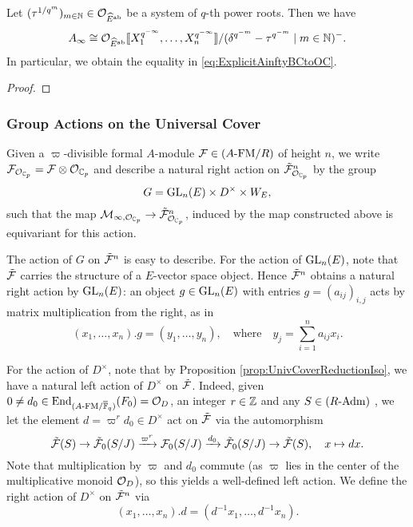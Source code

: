 \documentclass[../main.tex]{subfiles}
\begin{document}
\begin{cor}\label{cor:StructureOfAinfty}
  Let $(\tau^{1/q^m})_{m \in \mathbb{N}} \in \mathcal{O}_{\widehat E^{\mathrm{ab}}}$ be a  system of $q$-th power roots. Then we have 
  \begin{equation*}
  A_\infty \cong \mathcal{O}_{\widehat E^{\mathrm{ab}}}\llbracket X_1^{q^{-\infty}}, \dots,
  X_n^{q^{-\infty}}\rrbracket/(\delta^{q^{-m}} - \tau^{q^{-m}} \mid m \in \mathbb{N})^-.
  \end{equation*}
  In particular, we obtain the equality in \eqref{eq:ExplicitAinftyBCtoOC}.
\begin{proof}
\end{proof}
\end{cor}



\subsubsection{Group Actions on the Universal Cover} %
\label{ssub:Group Actions on the Universal Cover}
Given a $\varpi$-divisible formal $A$-module $\mathcal{F} \in {({A}\text-\allowbreak\mathrm{FM}/{R})}$ of height
$n$, we write $\mathcal{F}_{\mathcal{O}_{\mathbb{C}_p}} = \mathcal{F} \otimes \mathcal{O}_{\mathbb{C}_p}$ and describe a natural right
action on $\tilde {\mathcal{F}}_{\mathcal{O}_{\mathbb{C}_p}}^n$ by the group 
\begin{equation*}
  G = \operatorname{GL}_n(E) \times D^\times \times W_E,
\end{equation*}
such that the map $\mathcal{M}_{\infty, \mathcal{O}_{\mathbb{C}_p}} \to \tilde {\mathcal{F}}_{\mathcal{O}_{\mathbb{C}_p}}^n$,
induced by the map constructed above is equivariant for this action. 

The action of $G$ on $\tilde {\mathcal{F}}^n$ is easy to describe. For the action of
$\operatorname{GL}_n(E)$, note that $\tilde {\mathcal{F}}$ carries the structure of a $E$-vector space
object. Hence $\tilde {\mathcal{F}}^n$ obtains a natural right action by $\operatorname{GL}_n(E)$: an
object $g \in \operatorname{GL}_n(E)$ with entries $g = (a_{ij})_{i,j}$ acts by matrix
multiplication from the right, as in 
\begin{equation}\label{eq:UnivCoverGLnAction}
  (x_1, \dots, x_n).g = (y_1, \dots, y_n), \quad
  \text{where} \quad y_j = \sum_{i=1}^n a_{ij} x_i. 
\end{equation}

For the action of $D^\times$, note that by Proposition
\ref{prop:UnivCoverReductionIso}, we have 
a natural left action of $D^\times$ on $\tilde {\mathcal{F}}$. 
Indeed, given $0 \neq d_0 \in \operatorname{End}_{{({A}\text-\allowbreak\mathrm{FM}/{{\overline {\mathbb{F}}_q}})}}(F_0) = \mathcal{O}_D$, an
integer $r \in \mathbb{Z}$ and any $S \in {({R}\text-\allowbreak\mathrm{Adm})}$ , 
we let the element $d = \varpi^r d_0 \in D^\times$ act on $\tilde {\mathcal{F}}$ via the
automorphism
\begin{equation*}
  \tilde {\mathcal{F}}(S) \to \tilde {\mathcal{F}}_0(S/J) \xrightarrow{\varpi^{r}} \mathcal{F}_0(S/J) \xrightarrow{d_0}
  \tilde {\mathcal{F}}_0(S/J) \to \tilde {\mathcal{F}}(S), \quad x \mapsto dx.
\end{equation*}
Note that multiplication by $\varpi$ and $d_0$ commute (as $\varpi$ lies in the 
center of the multiplicative monoid $\mathcal{O}_D$), so this yields a well-defined
left action. We define the right action of $D^\times$ on $\tilde {\mathcal{F}}^n$ via
\begin{equation*}
  (x_1, \dots, x_n).d = (d^{-1} x_1, \dots, d^{-1} x_n).
\end{equation*}
\end{document}
